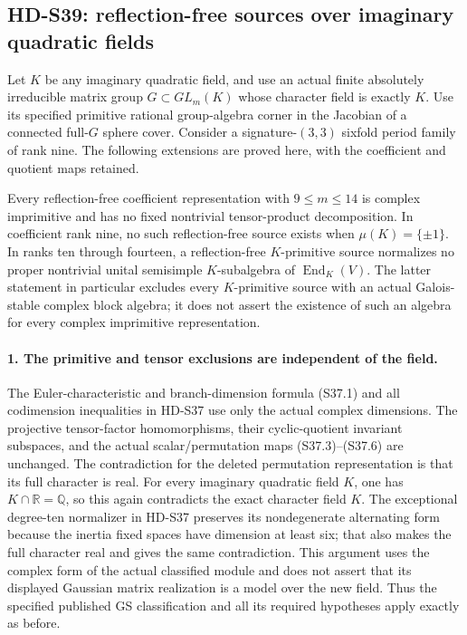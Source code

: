 \subsection{HD-S39: reflection-free sources over imaginary quadratic fields}
\label{sec:imaginary-reflection-free-extension}

Let \(K\) be any imaginary quadratic field, and use an actual
finite absolutely irreducible matrix group \(G\subset GL_m(K)\)
whose character field is exactly \(K\). Use its specified
primitive rational group-algebra corner in the Jacobian of a
connected full-\(G\) sphere cover. Consider a signature-\((3,3)\)
sixfold period family of rank nine. The following extensions are
proved here, with the coefficient and quotient maps retained.

Every reflection-free coefficient representation with
\(9\le m\le14\) is complex imprimitive and has no fixed
nontrivial tensor-product decomposition. In coefficient rank
nine, no such reflection-free source exists when
\(\mu(K)=\{\pm1\}\). In ranks ten through fourteen, a
reflection-free \(K\)-primitive source normalizes no proper
nontrivial unital semisimple \(K\)-subalgebra of
\(\operatorname{End}_K(V)\).
The latter statement in particular excludes every
\(K\)-primitive source with an actual Galois-stable complex
block algebra; it does not assert the existence of such an algebra
for every complex imprimitive representation.

\paragraph{1. The primitive and tensor exclusions are independent of the field.}
The Euler-characteristic and branch-dimension formula (S37.1)
and all codimension inequalities in HD-S37 use only the actual
complex dimensions. The projective tensor-factor homomorphisms,
their cyclic-quotient invariant subspaces, and the actual
scalar/permutation maps (S37.3)--(S37.6) are unchanged.
The contradiction for the deleted permutation representation is
that its full character is real. For every imaginary quadratic
field \(K\), one has \(K\cap\mathbb R=\mathbb Q\), so
this again contradicts the exact character field \(K\).
The exceptional degree-ten normalizer in HD-S37 preserves its
nondegenerate alternating form because the inertia fixed spaces
have dimension at least six; that also makes the full character
real and gives the same contradiction. This argument uses the
complex form of the actual classified module and does not assert
that its displayed Gaussian matrix realization is a model over
the new field. Thus the specified published GS classification
and all its required hypotheses apply exactly as before.

